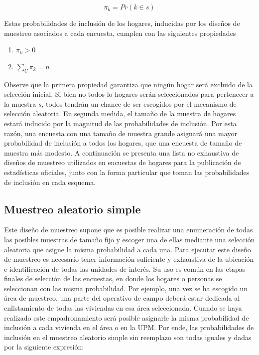 \documentclass[
  10pt,
  spanish,
]{book}
\providecommand{\tightlist}{%
  \setlength{\itemsep}{0pt}\setlength{\parskip}{0pt}}
\begin{document}
\[\pi_k = Pr (k \in s)\]

Estas probabilidades de inclusión de los hogares, inducidas por los diseños de muestreo asociados a cada encuesta, cumplen con las siguientes propiedades

\begin{enumerate}
\def\labelenumi{\arabic{enumi}.}
\tightlist
\item
  \(\pi_k > 0\)
\item
  \(\sum_U \pi_k = n\)
\end{enumerate}

Observe que la primera propiedad garantiza que ningún hogar será excluido de la selección inicial. Si bien no todos lo hogares serán seleccionados para pertenecer a la muestra \(s\), todos tendrán un chance de ser escogidos por el mecanismo de selección aleatoria. En segunda medida, el tamaño de la muestra de hogares estará inducido por la magnitud de las probabilidades de inclusión. Por esta razón, una encuesta con una tamaño de muestra grande asignará una mayor probabilidad de inclusión a todos los hogares, que una encuesta de tamaño de muestra más modesto. A continuación se presenta una lista no exhaustiva de diseños de muestreo utilizados en encuestas de hogares para la publicación de estadísticas oficiales, junto con la forma particular que toman las probabilidades de inclusión en cada esquema.

\hypertarget{muestreo-aleatorio-simple}{%
\subsection*{Muestreo aleatorio simple}\label{muestreo-aleatorio-simple}}

Este diseño de muestreo supone que es posible realizar una enumeración de todas las posibles muestras de tamaño fijo y escoger una de ellas mediante una selección aleatoria que asigne la misma probabilidad a cada una. Para ejecutar este diseño de muestreo es necesario tener información suficiente y exhaustiva de la ubicación e identificación de todas las unidades de interés. Su uso es común en las etapas finales de selección de las encuestas, en donde los hogares o personas se seleccionan con las misma probabilidad. Por ejemplo, una vez se ha escogido un área de muestreo, una parte del operativo de campo deberá estar dedicada al enlistamiento de todas las viviendas en esa área seleccionada. Cuando se haya realizado este empadronamiento será posible asignarle la misma probabilidad de inclusión a cada vivienda en el área o en la UPM. Por ende, las probabilidades de inclusión en el muestreo aleatorio simple sin reemplazo son todas iguales y dadas por la siguiente expresión:
\end{document}
